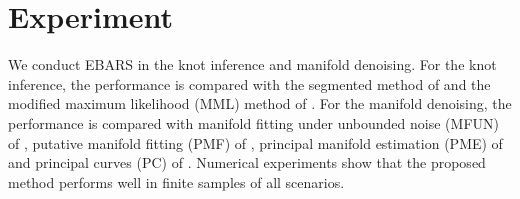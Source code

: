 \section{Experiment}

We conduct EBARS in the knot inference and manifold denoising. For the knot inference, the performance is compared with the segmented method of \citet{muggeo2003estimating} and the modified maximum likelihood (MML) method of \citet{doi:10.1080/01621459.2021.1947307}. %
For the manifold denoising, the performance is compared with manifold fitting under unbounded noise (MFUN) of \citet{yao2023manifoldfitting}, putative manifold fitting (PMF) of \citet{pmlr-v75-fefferman18a}, principal manifold estimation (PME) of \citet{10.1111/rssb.12416} and principal curves (PC) of \citet{principalcurve}. %
Numerical experiments show that the proposed method performs well in finite samples of all scenarios.

% 

% 


%